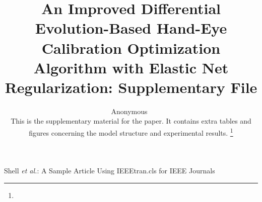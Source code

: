 \documentclass[lettersize,onecolumn]{IEEEtran}
\begin{document}
	
	\title{An Improved Differential Evolution-Based Hand-Eye Calibration Optimization Algorithm with Elastic Net Regularization: Supplementary File}
	
	\author{Anonymous~\IEEEmembership{}\\
		\vspace{0.3cm}
		\normalsize This is the supplementary material for the paper. It contains extra tables and figures concerning the model structure and experimental results.
		\thanks{}}%
	
	\markboth{}%
	{Shell \MakeLowercase{\textit{et al.}}: A Sample Article Using IEEEtran.cls for IEEE Journals}
	
	\IEEEpubid{}
	
	\maketitle
	\IEEEpubidadjcol
	
\end{document}

